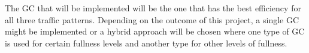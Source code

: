 The GC that will be implemented will be the one that has the best efficiency for all three traffic patterns. Depending on the outcome of this project, a single GC might be implemented or a hybrid approach will be chosen where one type of GC is used for certain fullness levels and another type for other levels of fullness.


